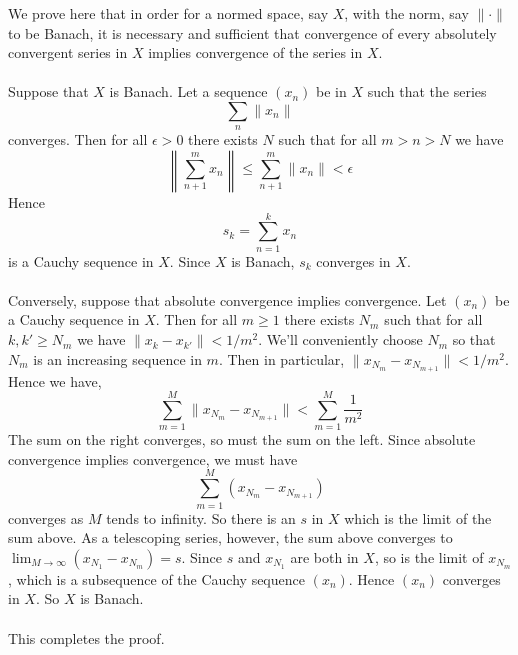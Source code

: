 \documentclass[12pt]{article}
\begin{document}
We prove here that in order for a normed space, say $X$, with the norm, say $\|\cdot\|$ to be
Banach, it is necessary and sufficient that convergence of every absolutely convergent series in $X$
implies convergence of the series in $X$.
\\
\\Suppose that $X$ is Banach. Let a sequence $(x_n)$ be in $X$ such that the series
$$\sum_n{\|x_n\|}$$
converges. Then for all $\epsilon > 0$ there exists $N$ such that for all $m > n > N$ we have
$$\left\|\sum_{n+1}^m{x_n}\right\|\leq\sum_{n+1}^m{\|x_n\|} < \epsilon$$
Hence
$$s_k = \sum_{n=1}^k{x_n}$$ is a Cauchy sequence in $X$. Since $X$ is Banach, $s_k$ converges in $X$.
\\
\\Conversely, suppose that absolute convergence implies convergence. Let $(x_n)$ be a Cauchy sequence
in $X$. Then for all $m \geq 1$ there exists $N_m$ such that for all $k, k' \geq N_m$ we have $\|x_k - x_{k'}\| < 1/m^2$.
We'll conveniently choose $N_m$ so that $N_m$ is an increasing sequence in $m$. Then in particular, $\|x_{N_m} - x_{N_{m+1}}\| < 1/m^2$. Hence we have,
$$\sum_{m = 1}^M{\|x_{N_m} - x_{N_{m+1}}\|} < \sum_{m=1}^M{\frac{1}{m^2}}$$
The sum on the right converges, so must the sum on the left. Since absolute convergence implies convergence,
we must have
$$\sum_{m = 1}^M{(x_{N_m} - x_{N_{m+1}})}$$
converges as $M$ tends to infinity. So there is an $s$ in $X$ which is the limit of the sum above. As a telescoping
series, however, the sum above converges to $\lim_{M\rightarrow\infty}({x_{N_1} - x_{N_m}}) = s$. Since $s$ and $x_{N_1}$ are both in $X$, so is the limit of $x_{N_m}$, which is a subsequence of the Cauchy sequence $(x_n)$. Hence $(x_n)$ converges in $X$. So $X$ is Banach.
\\
\\This completes the proof.
\end{document}
